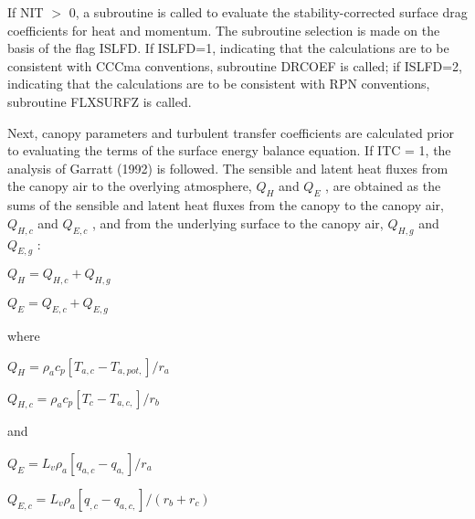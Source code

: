 If N\+I\+T $>$ 0, a subroutine is called to evaluate the stability-\/corrected surface drag coefficients for heat and momentum. The subroutine selection is made on the basis of the flag I\+S\+L\+F\+D. If I\+S\+L\+F\+D=1, indicating that the calculations are to be consistent with C\+C\+Cma conventions, subroutine D\+R\+C\+O\+E\+F is called; if I\+S\+L\+F\+D=2, indicating that the calculations are to be consistent with R\+P\+N conventions, subroutine F\+L\+X\+S\+U\+R\+F\+Z is called.

Next, canopy parameters and turbulent transfer coefficients are calculated prior to evaluating the terms of the surface energy balance equation. If I\+T\+C = 1, the analysis of Garratt (1992) is followed. The sensible and latent heat fluxes from the canopy air to the overlying atmosphere, $Q_H$ and $Q_E$ , are obtained as the sums of the sensible and latent heat fluxes from the canopy to the canopy air, $Q_{H,c}$ and $Q_{E,c}$ , and from the underlying surface to the canopy air, $Q_{H,g}$ and $Q_{E,g}$ \+:

$Q_H = Q_{H,c} + Q_{H,g}$

$Q_E = Q_{E,c} + Q_{E,g}$

where

$Q_H = \rho_a c_p [T_{a,c} - T_{a,pot,} ]/r_a$

$Q_{H,c} = \rho_a c_p [T_c - T_{a,c,} ]/r_b$

and

$Q_E = L_v \rho_a [q_{a,c} - q_{a,} ]/r_a$

$Q_{E,c} = L_v \rho_a [q_{,c} - q_{a,c,} ]/(r_b + r_c )$

